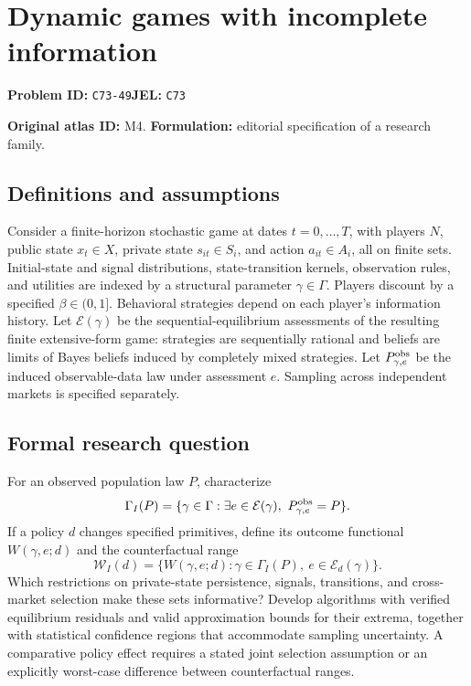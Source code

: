 \documentclass[11pt,a4paper]{article}
\begin{document}
\section*{Dynamic games with incomplete information}
\textbf{Problem ID:} \texttt{C73-49}\quad \textbf{JEL:} \texttt{C73}\par
\label{problem:OP-0004}
\label{atlas:prob:M4}

\noindent\textbf{Original atlas ID:} M4. \textbf{Formulation:} editorial specification of a research family.

\subsection*{Definitions and assumptions}

Consider a finite-horizon stochastic game at dates $t=0,\ldots,T$, with players $N$, public state $x_t\in X$, private state $s_{it}\in S_i$, and action $a_{it}\in A_i$, all on finite sets. Initial-state and signal distributions, state-transition kernels, observation rules, and utilities are indexed by a structural parameter $\gamma\in\Gamma$. Players discount by a specified $\beta\in(0,1]$. Behavioral strategies depend on each player's information history. Let $\mathcal E(\gamma)$ be the sequential-equilibrium assessments of the resulting finite extensive-form game: strategies are sequentially rational and beliefs are limits of Bayes beliefs induced by completely mixed strategies. Let $P_{\gamma,e}^{\rm obs}$ be the induced observable-data law under assessment $e$. Sampling across independent markets is specified separately.

\subsection*{Formal research question}

For an observed population law $P$, characterize
\[
\Gamma_I(P)=\{\gamma\in\Gamma:\exists e\in\mathcal E(\gamma),\ P_{\gamma,e}^{\rm obs}=P\}.
\]
If a policy $d$ changes specified primitives, define its outcome functional $W(\gamma,e;d)$ and the counterfactual range
\[
\mathcal W_I(d)=\{W(\gamma,e;d):\gamma\in\Gamma_I(P),\ e\in\mathcal E_d(\gamma)\}.
\]
Which restrictions on private-state persistence, signals, transitions, and cross-market selection make these sets informative? Develop algorithms with verified equilibrium residuals and valid approximation bounds for their extrema, together with statistical confidence regions that accommodate sampling uncertainty. A comparative policy effect requires a stated joint selection assumption or an explicitly worst-case difference between counterfactual ranges.
\end{document}
